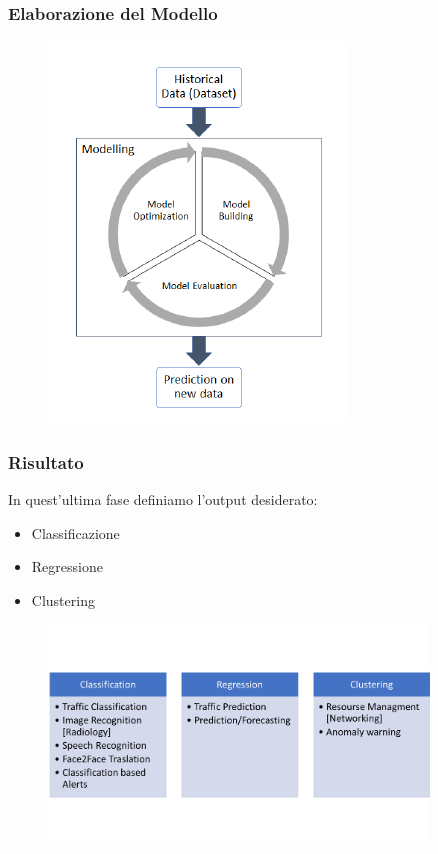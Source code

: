 \documentclass[xcolor=dvipsnames]{beamer}
\begin{document}
\begin{frame}
    \frametitle{Elaborazione del Modello}
    \begin{figure}[htbp]
        \includegraphics{MLProcess.png}
    \end{figure}
\end{frame}

\begin{frame}
    \frametitle{Risultato}
    In quest'ultima fase definiamo l'output desiderato:
    \begin{itemize}
        \item Classificazione
        \item Regressione 
        \item Clustering
    \end{itemize}
    \begin{figure}
        \includegraphics[width=0.9\textwidth , height=0.7\textheight]{categoryML.png}
    \end{figure}
\end{frame}
\end{document}
